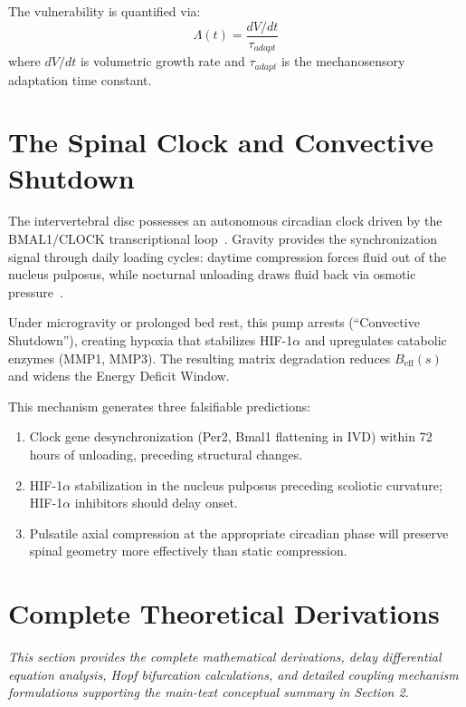 The vulnerability is quantified via:
\begin{equation}
\Lambda(t) = \frac{dV/dt}{\tau_{adapt}}
\end{equation}
where $dV/dt$ is volumetric growth rate and $\tau_{adapt}$ is the mechanosensory adaptation time constant.

\section{The Spinal Clock and Convective Shutdown}

The intervertebral disc possesses an autonomous circadian clock driven by the BMAL1/CLOCK transcriptional loop~\cite{dudek2017clock}. Gravity provides the synchronization signal through daily loading cycles: daytime compression forces fluid out of the nucleus pulposus, while nocturnal unloading draws fluid back via osmotic pressure~\cite{urban2004nutrition}.

Under microgravity or prolonged bed rest, this pump arrests (``Convective Shutdown''), creating hypoxia that stabilizes HIF-1$\alpha$ and upregulates catabolic enzymes (MMP1, MMP3). The resulting matrix degradation reduces $B_{\mathrm{eff}}(s)$ and widens the Energy Deficit Window.

This mechanism generates three falsifiable predictions:
\begin{enumerate}
    \item Clock gene desynchronization (Per2, Bmal1 flattening in IVD) within 72 hours of unloading, preceding structural changes.
    \item HIF-1$\alpha$ stabilization in the nucleus pulposus preceding scoliotic curvature; HIF-1$\alpha$ inhibitors should delay onset.
    \item Pulsatile axial compression at the appropriate circadian phase will preserve spinal geometry more effectively than static compression.
\end{enumerate}

\section{Complete Theoretical Derivations}
\label{sec:supp_theory}

\textit{This section provides the complete mathematical derivations, delay differential equation analysis, Hopf bifurcation calculations, and detailed coupling mechanism formulations supporting the main-text conceptual summary in Section 2.}

